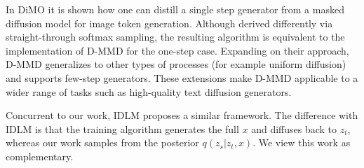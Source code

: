 In DiMO \citep{zhu2025dimo} it is shown how one can distill a single step generator from a masked diffusion model for image token generation. Although derived differently via straight-through softmax sampling, the resulting algorithm is equivalent to the implementation of D-MMD for the one-step case. Expanding on their approach, D-MMD generalizes to other types of processes (for example uniform diffusion) and supports few-step generators. These extensions make D-MMD applicable to a wider range of tasks such as high-quality text diffusion generators.

Concurrent to our work, IDLM \citep{li2026idlm} proposes a similar framework. The difference with IDLM is that the training algorithm generates the full $x$ and diffuses back to $z_t$, whereas our work samples from the posterior $q(z_s | z_t, x)$. We view this work as complementary.



